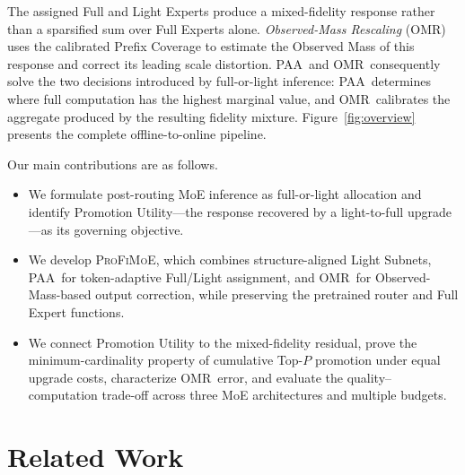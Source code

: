 \documentclass{article}
\newcommand{\PAA}{\textsc{PAA}}
\newcommand{\OMR}{\textsc{OMR}}
\newcommand{\method}{\textsc{ProFiMoE}}
\begin{document}
The assigned Full and Light Experts produce a mixed-fidelity response rather than a sparsified sum over Full Experts alone. \emph{Observed-Mass Rescaling} (\OMR) uses the calibrated Prefix Coverage to estimate the Observed Mass of this response and correct its leading scale distortion. \PAA\ and \OMR\ consequently solve the two decisions introduced by full-or-light inference: \PAA\ determines where full computation has the highest marginal value, and \OMR\ calibrates the aggregate produced by the resulting fidelity mixture. Figure~\ref{fig:overview} presents the complete offline-to-online pipeline.

Our main contributions are as follows.
\begin{itemize}
  \item We formulate post-routing MoE inference as full-or-light allocation and identify Promotion Utility---the response recovered by a light-to-full upgrade---as its governing objective.
  \item We develop \method, which combines structure-aligned Light Subnets, \PAA\ for token-adaptive Full/Light assignment, and \OMR\ for Observed-Mass-based output correction, while preserving the pretrained router and Full Expert functions.
  \item We connect Promotion Utility to the mixed-fidelity residual, prove the minimum-cardinality property of cumulative Top-$P$ promotion under equal upgrade costs, characterize \OMR\ error, and evaluate the quality--computation trade-off across three MoE architectures and multiple budgets.
\end{itemize}

\section{Related Work}
\label{sec:related}
\end{document}
